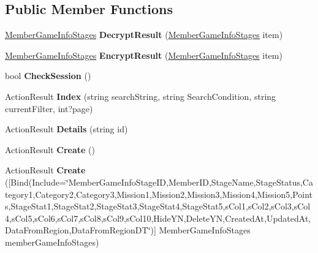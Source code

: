 \subsection*{Public Member Functions}
\begin{DoxyCompactItemize}
\item 
\hyperlink{a00139}{Member\+Game\+Info\+Stages} {\bfseries Decrypt\+Result} (\hyperlink{a00139}{Member\+Game\+Info\+Stages} item)\hypertarget{a00140_a0d18f71d81e20f9eaaf4f50c87bf424b}{}\label{a00140_a0d18f71d81e20f9eaaf4f50c87bf424b}

\item 
\hyperlink{a00139}{Member\+Game\+Info\+Stages} {\bfseries Encrypt\+Result} (\hyperlink{a00139}{Member\+Game\+Info\+Stages} item)\hypertarget{a00140_a3d3a9c79b27c19fe87de6efd10106f56}{}\label{a00140_a3d3a9c79b27c19fe87de6efd10106f56}

\item 
bool {\bfseries Check\+Session} ()\hypertarget{a00140_ae26d5aebd91972a9f164d43af318653b}{}\label{a00140_ae26d5aebd91972a9f164d43af318653b}

\item 
Action\+Result {\bfseries Index} (string search\+String, string Search\+Condition, string current\+Filter, int?page)\hypertarget{a00140_ab14bc8a4b70c5031f3c4c729e15f522d}{}\label{a00140_ab14bc8a4b70c5031f3c4c729e15f522d}

\item 
Action\+Result {\bfseries Details} (string id)\hypertarget{a00140_a253ee107f9cf48cb1235e81b6cae8b04}{}\label{a00140_a253ee107f9cf48cb1235e81b6cae8b04}

\item 
Action\+Result {\bfseries Create} ()\hypertarget{a00140_a3d44da9c2bfa9cf364ac2a989a6a5c38}{}\label{a00140_a3d44da9c2bfa9cf364ac2a989a6a5c38}

\item 
Action\+Result {\bfseries Create} (\mbox{[}Bind(Include=\char`\"{}Member\+Game\+Info\+Stage\+ID,Member\+ID,Stage\+Name,Stage\+Status,Category1,Category2,Category3,Mission1,Mission2,Mission3,Mission4,Mission5,Points,Stage\+Stat1,Stage\+Stat2,Stage\+Stat3,Stage\+Stat4,Stage\+Stat5,s\+Col1,s\+Col2,s\+Col3,s\+Col4,s\+Col5,s\+Col6,s\+Col7,s\+Col8,s\+Col9,s\+Col10,Hide\+YN,Delete\+YN,Created\+At,Updated\+At,Data\+From\+Region,Data\+From\+Region\+DT\char`\"{})\mbox{]} Member\+Game\+Info\+Stages member\+Game\+Info\+Stages)\hypertarget{a00140_aa9ff01c4930ec56f82be42cd8fd5d6f8}{}\label{a00140_aa9ff01c4930ec56f82be42cd8fd5d6f8}


\end{DoxyCompactItemize}
